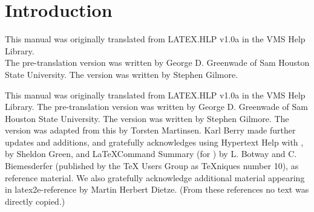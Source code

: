 \documentclass[12pt, a4paper, onecolumn]{article}
\begin{document}
	
	\section{Introduction}
	This manual was originally translated from LATEX.HLP v1.0a in the VMS Help Library.\\[8pt] %
	The pre-translation version was written by George D. Greenwade of Sam Houston State University.  The  version was written by Stephen Gilmore.  
	
	This manual was originally translated from LATEX.HLP v1.0a in the VMS Help Library.  The pre-translation version was written by George D. Greenwade of Sam Houston State University.  The  version was written by Stephen Gilmore.  The \LaTeXe version was adapted from this by Torsten Martinsen.  Karl Berry made further updates and additions, and gratefully acknowledges using Hypertext Help with \LaTeXe, by Sheldon Green, and \LaTeX Command Summary (for ) by L. Botway and C. Biemesderfer (published by the TeX Users Group as TeXniques number 10), as reference material.  We also gratefully acknowledge additional material appearing in latex2e-reference by Martin Herbert Dietze.  (From these references no text was directly copied.)
	
\end{document}

